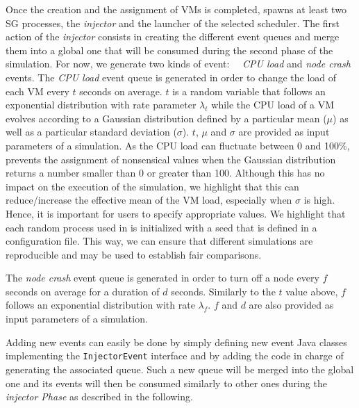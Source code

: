 Once the creation and the assignment of VMs is completed, \vmps spawns
at least two SG processes, the \emph{injector} and the launcher of the
selected scheduler.  The first action of the \emph{injector} consists
in creating the different event queues and merge them into a global
one that will be consumed during the second phase of the simulation.
For now, we generate two kinds of event: ~~\emph{CPU load} and
\emph{node crash} events.
%
The \emph{CPU load} event queue is generated in order to change the
load of each VM every $t$ seconds on average. $t$ is a random variable
that follows an exponential distribution with rate parameter
$\lambda_t$ while the CPU load of a VM evolves according to a
Gaussian distribution defined by a particular mean ($\mu$) as well as
a particular standard deviation ($\sigma$). $t$, $\mu$ and $\sigma$
are provided as input parameters of a simulation.  As the CPU load can
fluctuate between 0 and 100\%, \vmps prevents the assignment of
nonsensical values when the Gaussian distribution returns a number
smaller than 0 or greater than 100. Although this has no impact on the
execution of the simulation, we highlight that this can
reduce/increase the effective mean of the VM load, especially when
$\sigma$ is high.  Hence, it is important for users to specify
appropriate values.
We highlight that each
random process used in \vmps is initialized with a seed that is
defined in a configuration file. This way, we can ensure that
different simulations are reproducible and may be used to establish
fair comparisons.

The \emph{node crash} event queue is generated in order to turn off a
node every $f$ seconds on average for a duration of $d$ seconds.
Similarly to the $t$ value above, $f$ follows an exponential
distribution with rate $\lambda_f$. $f$ and $d$ are also provided as
input parameters of a simulation.

Adding new events can easily be done by simply defining new event Java
classes implementing the \texttt{InjectorEvent} interface and by
adding the code in charge of generating the associated queue. Such a
new queue will be merged into the global one and its events will then be
consumed similarly to other ones during the \emph{injector Phase} as described in the following.

